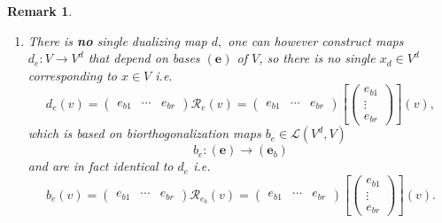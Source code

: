 \documentclass[aps,preprint]{revtex4}
\newtheorem{lemma}[theorem]{Lemma}
\newtheorem{remark}[theorem]{Remark}
\newenvironment{proof}[1][Proof]{\noindent\textbf{#1.} }{\ \rule{0.5em}{0.5em}}
\begin{document}
\begin{remark}
\begin{enumerate}
\begin{enumerate}
\begin{lemma}
\begin{equation}
d_{e}=b_{e}
\end{equation}
\end{lemma}

\begin{proof}
as 
\begin{equation}
b_{e}\left( v\right) =\sum_{1\leq k\leq r}e_{bk}\mathcal{R}_{e}\left(
v\right) _{k}=\sum_{1\leq k\leq r}e_{bk}\left[ e_{bk}\right] \left( v\right)
\end{equation}%
and 
\begin{equation}
d_{e}\left( v\right) =\sum_{1\leq k\leq r}e_{bk}\left[ e_{bk}\right] \left(
v\right) =\sum_{1\leq k\leq r}e_{bk}\mathcal{R}_{e}\left( v\right) _{k}
\end{equation}
thus 
\begin{equation}
d_{e}=b_{e}.\blacksquare
\end{equation}
\end{proof}
\end{enumerate}

\item There is \textbf{no} single dualizing map $d,$ one can however
construct maps $d_{e}:V\rightarrow V^{d}$ that depend on bases $\left( 
\boldsymbol{e}\right) $ of $V$, so there is no single $x_{d}\in V^{d}$
corresponding to $x\in V$ i.e. 
\begin{equation}
d_{e}\left( v\right) =\left( 
\begin{array}{ccc}
e_{b1} & \cdots & e_{br}%
\end{array}%
\right) \mathcal{R}_{e}\left( v\right) =\left( 
\begin{array}{ccc}
e_{b1} & \cdots & e_{br}%
\end{array}%
\right) \left[ \left( 
\begin{array}{c}
e_{b1} \\ 
\vdots \\ 
e_{br}%
\end{array}%
\right) \right] \left( \overset{}{v}\right) ,
\end{equation}%
which is based on biorthogonalization maps $b_{e}\in \mathcal{L}\left(
V^{d},V\right) $ 
\begin{equation}
b_{e}:\left( \boldsymbol{e}\right) \rightarrow \left( \boldsymbol{e}%
_{b}\right)
\end{equation}%
and are in fact identical to $d_{e}$ i.e. 
\begin{equation}
b_{e}\left( v\right) =\left( 
\begin{array}{ccc}
e_{b1} & \cdots & e_{br}%
\end{array}%
\right) \mathcal{R}_{e_{b}}\left( v\right) =\left( 
\begin{array}{ccc}
e_{b1} & \cdots & e_{br}%
\end{array}%
\right) \left[ \left( 
\begin{array}{c}
e_{b1} \\ 
\vdots \\ 
e_{br}%
\end{array}%
\right) \right] \left( \overset{}{v}\right) .
\end{equation}


\end{enumerate}
\end{remark}
\end{document}
